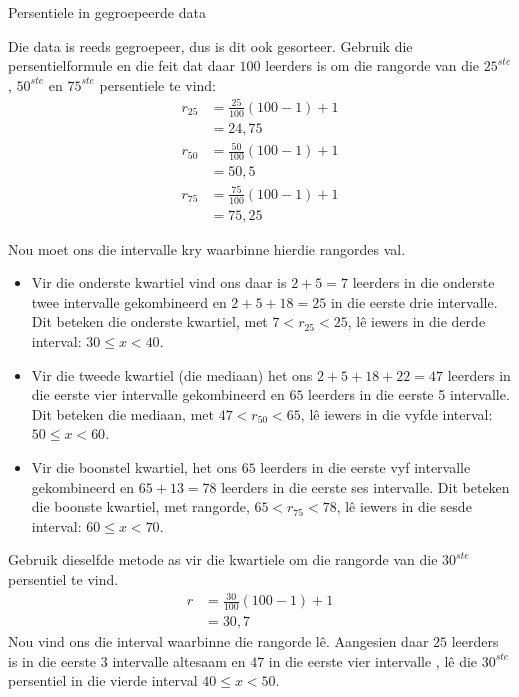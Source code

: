 \begin{wex}{Persentiele in gegroepeerde data}
{  

  Die data is reeds gegroepeer, dus is dit ook gesorteer. Gebruik die persentielformule en die feit dat daar
  $100$ leerders is om die rangorde van die $25^{ste}$, $50^{ste}$ en
  $75^{ste}$ persentiele te vind:
  \begin{align*}
    r_{25} &= \frac{25}{100}\left(100-1\right)+1 \\
          &= 24,75 \\
    r_{50} &= \frac{50}{100}\left(100-1\right)+1 \\
          &= 50,5 \\
    r_{75} &= \frac{75}{100}\left(100-1\right)+1 \\
          &= 75,25
  \end{align*}

  Nou moet ons die intervalle kry waarbinne hierdie rangordes val.
  \begin{itemize}
  \item Vir die onderste kwartiel vind ons daar is $2 + 5 = 7$ leerders in die onderste twee intervalle gekombineerd en $2 + 5 + 18 = 25$
    in die eerste drie intervalle. Dit beteken die onderste kwartiel, met
    $7 < r_{25} < 25$,
    lê iewers in die derde interval: $30 \leq x < 40$.
  \item Vir die tweede kwartiel (die mediaan) het ons
    $2 + 5 + 18 + 22 = 47$ leerders in die eerste vier intervalle gekombineerd en $65$ leerders in die eerste 5 intervalle. Dit beteken die mediaan, met $47 < r_{50} < 65$,
    l\^e iewers in die vyfde interval: $50 \leq x < 60$.
  \item Vir die boonstel kwartiel, het ons $65$ leerders in die eerste vyf intervalle gekombineerd en  $65 + 13 = 78$ 
    leerders in die eerste ses intervalle. Dit beteken die boonste kwartiel, met rangorde,
    $65 < r_{75} < 78$,
    l\^e iewers in die sesde interval: $60 \leq x < 70$.
  \end{itemize}


  Gebruik dieselfde metode as vir die kwartiele om die rangorde van die $30^{ste}$ persentiel te vind.
  \begin{align*}
    r &= \frac{30}{100}\left(100-1\right)+1 \\
      &= 30,7
  \end{align*}
  Nou vind ons die interval waarbinne die rangorde l\^e. Aangesien daar $25$ leerders is in die eerste $3$ intervalle altesaam en $47$
  in die eerste vier intervalle , l\^e die $30^{ste}$ persentiel in die vierde interval $40 \leq x < 50$.
}
\end{wex}

